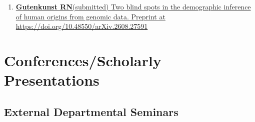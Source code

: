\documentclass[11pt]{article}
\begin{document}
\begin{enumerate}

\item \href{https://doi.org/10.48550/arXiv.2608.27591}{\textbf{Gutenkunst RN}\corresponding (submitted) Two blind spots in the demographic inference of human origins from genomic data. Preprint at https://doi.org/10.48550/arXiv.2608.27591}

\end{enumerate}

\section*{Conferences/Scholarly Presentations}
\subsection*{External Departmental Seminars}
\end{document}

